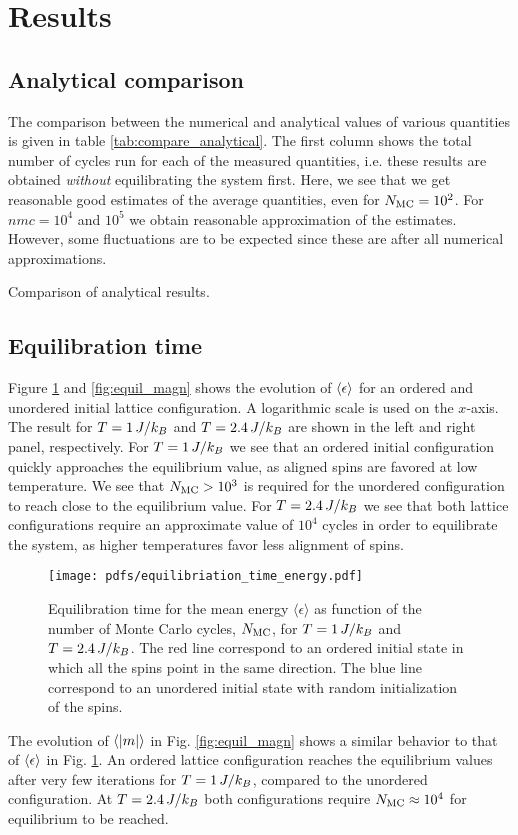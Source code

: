 \section{Results}\label{sec:results}
\subsection{Analytical comparison}\label{subsec_results:analytical}
The comparison between the numerical and analytical values of various quantities is given in table \ref{tab:compare_analytical}. The first column shows the total number of cycles run for each of the measured quantities, i.e. these results are obtained \textit{without} equilibrating the system first. Here, we see that we get reasonable good estimates of the average quantities, even for $N_\mathrm{MC}=10^2$. For $nmc=10^4$ and $10^5$ we obtain reasonable approximation of the estimates. However, some fluctuations are to be expected since these are after all numerical approximations. 

\begin{table}[!ht]
    
    \caption{Comparison of analytical results. }
    \label{tab:compare_analytical}
\end{table}


\subsection{Equilibration time}\label{subsec_results:equilibriation_time}
Figure \ref{fig:equil_energy} and \ref{fig:equil_magn} shows the evolution of $\expval{\epsilon}$ for an ordered and unordered initial lattice configuration. A logarithmic scale is used on the $x$-axis. The result for $T=1\,J/k_B$ and $T=2.4\,J/k_B$ are shown in the left and right panel, respectively. For $T=1\,J/k_B$ we see that an ordered initial configuration quickly approaches the equilibrium value, as aligned spins are favored at low temperature. We see that $N_\mathrm{MC}>10^3$ is required for the unordered configuration to reach close to the equilibrium value. For $T=2.4\,J/k_B$ we see that both lattice configurations require an approximate value of $10^4$ cycles in order to equilibrate the system, as higher temperatures favor less alignment of spins.    
\begin{figure}[!ht]
    \texttt{[image: pdfs/equilibriation\_time\_energy.pdf]}
    \caption{Equilibration time for the mean energy $\langle \epsilon \rangle $ as function of the number of Monte Carlo cycles, $N_\mathrm{MC}$, for $T=1\,J/k_B$ and $T=2.4\,J/k_B$. The red line correspond to an ordered initial state in which all the spins point in the same direction. The blue line correspond to an unordered initial state with random initialization of the spins.}
    \label{fig:equil_energy}
\end{figure}
The evolution of $\expval{\abs{m}}$ in Fig. \ref{fig:equil_magn} shows a similar behavior to that of $\expval{\epsilon}$ in Fig. \ref{fig:equil_energy}. An ordered lattice configuration reaches the equilibrium values after very few iterations for $T=1\,J/k_B$, compared to the unordered configuration. At $T=2.4\,J/k_B$ both configurations require $N_\mathrm{MC}\approx10^4$ for equilibrium to be reached. 

